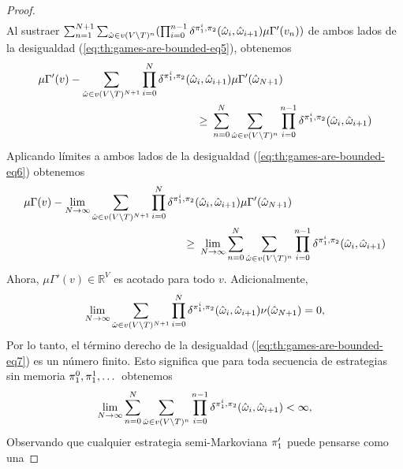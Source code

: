 \begin{proof}
\begin{align}
  \end{align}
  Al sustraer
  $\sum^{N+1}_{n=1} \sum_{\hat{\omega} \in v(V \setminus T)^{n}}(\prod^{n-1}_{i=0} \delta^{\pi_{1}^i, \pi_{2}}(\hat{\omega}_i, \hat{\omega}_{i+1}) \mu \Gamma' (v_{n}))$
  de ambos lados de la desigualdad
  (\ref{eq:th:games-are-bounded-eq5}), obtenemos
  \begin{align}
    \label{eq:th:games-are-bounded-eq6}
    \mu \Gamma'(v)  - \sum_{\hat{\omega} \in v(V \setminus T)^{N+1}}\prod^{N}_{i=0} \delta^{\strat{1}^i, \strat{2}}(\hat{\omega}_i,\hat{\omega}_{i+1}) \mu \Gamma'(\hat{\omega}_{N+1})  \hspace{-6.5em}& \\
    \geq \ & \sum^{N}_{n=0} \sum_{\hat{\omega} \in v(V \setminus T)^n}\prod^{n-1}_{i=0} \delta^{\strat{1}^i, \strat{2}}(\hat{\omega}_i, \hat{\omega}_{i+1}) \notag
  \end{align}
  Aplicando límites a ambos lados de la desigualdad
  (\ref{eq:th:games-are-bounded-eq6}) obtenemos
  \begin{align}
    \label{eq:th:games-are-bounded-eq7}
    \mu \Gamma(v)  - \lim_{N \to \infty} \sum_{\hat{\omega} \in v(V \setminus T)^{N+1}}\prod^{N}_{i=0} \delta^{\strat{1}^i, \strat{2}}(\hat{\omega}_i,\hat{\omega}_{i+1}) \mu \Gamma'(\hat{\omega}_{N+1})  \hspace{-8.5em}& \\
    \geq \ & \lim_{N \to \infty} \sum^{N}_{n=0} \sum_{\hat{\omega} \in v(V \setminus T)^n}\prod^{n-1}_{i=0} \delta^{\strat{1}^i, \strat{2}}(\hat{\omega}_i, \hat{\omega}_{i+1}) \notag
  \end{align}
  Ahora,  $\mu \Gamma'(v) \in \mathbb{R}^V$ es acotado para todo $v$. Adicionalmente,
  \[
  \lim_{N \to \infty}\sum_{\hat{\omega} \in v(V \setminus T)^{N+1}}\prod^{N}_{i=0} \delta^{\pi_{1}^i, \pi_{2}}(\hat{\omega}_i,\hat{\omega}_{i+1}) \nu(\hat{\omega}_{N+1}) = 0,
  \]
  Por lo tanto, el término derecho de la desigualdad
  (\ref{eq:th:games-are-bounded-eq7}) es un número finito.  Esto significa que
  para toda secuencia de estrategias sin memoria
  $\pi_{1}^0,\pi_{1}^1, \dots$ obtenemos
  \[
  \lim_{N \to \infty} \sum^{N}_{n=0} \sum_{\hat{\omega} \in v(V \setminus T)^n}\prod^{n-1}_{i=0} \delta^{\pi_{1}^i, \pi_{2}}(\hat{\omega}_i, \hat{\omega}_{i+1}) < \infty,
  \]
  Observando que cualquier estrategia semi-Markoviana $\pi_{1}'$ puede pensarse como una

\end{proof}
